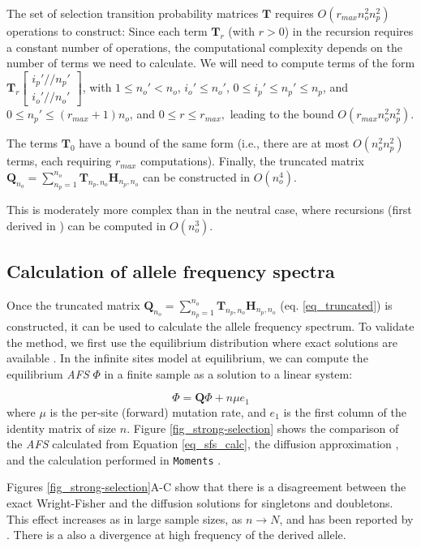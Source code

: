 \documentclass[review]{elsarticle}
\newcommand{\ra}{\rightarrow}
\newcommand{\dslash}{/\!\!/}
\newcommand{\Coalc}[4]{\begin{bmatrix}#1\dslash #2 \\ #3\dslash #4 \end{bmatrix}}
\begin{document}
The set of selection transition probability matrices $\mathbf{T}$ requires $O(r_{max}n_o^2 n_p^2)$
operations to construct: Since each term $\mathbf{T}_{r}$ (with $r>0$)  in the recursion requires a constant number of operations, 
the computational complexity depends on the number of terms we need to calculate. We will need to compute terms of the form 
 $\mathbf{T}_{r}\Coalc{i_p'}{n_p'}{i_o'}{n_o'}$, with $1 \leq n_o'<n_o$, $i_o' \leq n_o'$, $0\leq i_p' \leq n_p' \leq n_p$, and $0\leq n_p' \leq (r_{max}+1) n_o$, 
 and $0\leq r \leq r_{max},$ leading to the bound $O(r_{max}n_o^2 n_p^2).$  
 
 
 The terms  $\mathbf{T}_{0}$ have a bound of the same form (i.e., there are at most $O(n_o^2 n_p^2)$ terms, each requiring $r_{max}$ computations).  
Finally, the truncated matrix $\mathbf{Q}_{n_o} = \sum_{n_p=1}^{n_{o}} \mathbf{T}_{n_p,n_o} \mathbf{H}_{n_p,n_o}$ can be constructed in $O(n_o^4)$.


This is moderately more complex than in the neutral case, where recursions (first derived in \cite{BhaskarEtAl2014}) can be computed in $O(n_o^3)$.

\subsection{Calculation of allele frequency spectra}
\label{subsec_afs}

Once the truncated matrix
$\mathbf{Q}_{n_o} = \sum_{n_p=1}^{n_{o}} \mathbf{T}_{n_p,n_o} \mathbf{H}_{n_p,n_o}$
(eq. \ref{eq_truncated}) is constructed, it can be used to calculate the allele frequency spectrum. To
validate the method, we first use the equilibrium distribution where exact solutions are available
\citep{Krukov2016}. In the infinite sites model at equilibrium, we can compute the
equilibrium \textit{AFS} $\Phi$ in a finite sample as a solution to a linear system:

\begin{equation}
  \label{eq_sfs_calc}
  \Phi = \mathbf{Q}\Phi  + n \mu e_1
\end{equation}
where $\mu$ is the per-site (forward) mutation rate, and $e_1$ is the first column of the identity
matrix of size $n$. Figure \ref{fig_strong-selection} shows the comparison of the \textit{AFS}
calculated from Equation \ref{eq_sfs_calc}, the diffusion approximation
\cite[eq. 9.23]{Ewens2004}, and the calculation performed in \texttt{Moments}
\citep{JouganousEtAl2017}.

Figures \ref{fig_strong-selection}A-C show that there is a disagreement between the exact
Wright-Fisher and the diffusion solutions for singletons and doubletons. This effect increases as in
large sample sizes, as $n \ra N$, and has been reported by \citep{BhaskarEtAl2014}. There is a also
a divergence at high frequency of the derived allele. %
\end{document}
